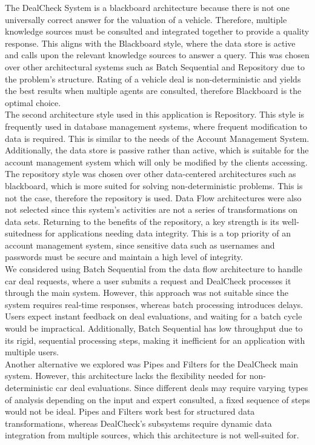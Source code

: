 \documentclass[]{article}
\begin{document}
The DealCheck System is a blackboard architecture because there is not one universally correct answer for the valuation of a vehicle. Therefore, multiple knowledge sources must be consulted and integrated together to provide a quality response. This aligns with the Blackboard style, where the data store is active and calls upon the relevant knowledge sources to answer a query. This was chosen over other architectural systems such as Batch Sequential and Repository due to the problem’s structure. Rating of a vehicle deal is non-deterministic and yields the best results when multiple agents are consulted, therefore Blackboard is the optimal choice.\\

The second architecture style used in this application is Repository. This style is frequently used in database management systems, where frequent modification to data is required. This is similar to the needs of the Account Management System. Additionally, the data store is passive rather than active, which is suitable for the account management system which will only be modified by the clients accessing. The repository style was chosen over other data-centered architectures such as blackboard, which is more suited for solving non-deterministic problems. This is not the case, therefore the repository is used. Data Flow architectures were also not selected since this system’s activities are not a series of transformations on data sets. Returning to the benefits of the repository, a key strength is its well-suitedness for applications needing data integrity. This is a top priority of an account management system, since sensitive data such as usernames and passwords must be secure and maintain a high level of integrity.\\

We considered using Batch Sequential from the data flow architecture to handle car deal requests, where a user submits a request and DealCheck processes it through the main system. However, this approach was not suitable since the system requires real-time responses, whereas batch processing introduces delays. Users expect instant feedback on deal evaluations, and waiting for a batch cycle would be impractical. Additionally, Batch Sequential has low throughput due to its rigid, sequential processing steps, making it inefficient for an application with multiple users.\\

Another alternative we explored was Pipes and Filters for the DealCheck main system. However, this architecture lacks the flexibility needed for non-deterministic car deal evaluations. Since different deals may require varying types of analysis depending on the input and expert consulted, a fixed sequence of steps would not be ideal. Pipes and Filters work best for structured data transformations, whereas DealCheck's subsystems require dynamic data integration from multiple sources, which this architecture is not well-suited for.\\
\end{document}
